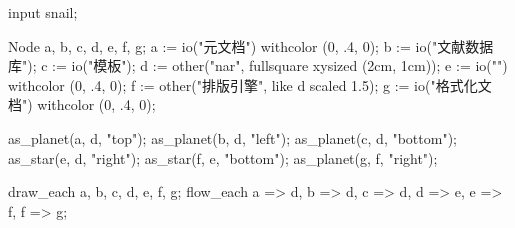\usemodule[zhfonts]
  
\startMPpage
input snail;

Node a, b, c, d, e, f, g;
a := io("元文档") withcolor (0, .4, 0);
b := io("文献数据库");
c := io("模板");
d := other("nar", fullsquare xysized (2cm, 1cm));
e := io("") withcolor (0, .4, 0);
f := other("排版引擎", like d scaled 1.5);
g := io("格式化文档") withcolor (0, .4, 0);

as_planet(a, d, "top"); as_planet(b, d, "left"); as_planet(c, d, "bottom");
as_star(e, d, "right"); as_star(f, e, "bottom"); as_planet(g, f, "right");

draw_each a, b, c, d, e, f, g;
flow_each a => d, b => d, c => d, d => e, e => f, f => g;
\stopMPpage
